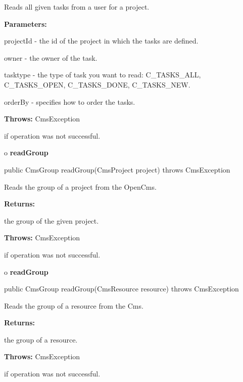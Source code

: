 \begin{description}
\htmlDD Reads all given tasks from a user for a project. 

\begin{description}
\item {\bf Parameters:}  

projectId - the id of the project in which the tasks are defined.  

owner - the owner of the task.  

tasktype - the type of task you want to read: C\_TASKS\_ALL, C\_TASKS\_OPEN,
C\_TASKS\_DONE, C\_TASKS\_NEW.  

orderBy - specifies how to order the tasks.  
\item {\bf Throws:} CmsException  

if operation was not successful.  
\end{description}

\end{description}

o {\bf readGroup} 

\begin{PRE}
 public CmsGroup readGroup(CmsProject project) throws CmsException
\end{PRE}

\begin{description}
\htmlDD Reads the group of a project from the OpenCms. 

\begin{description}
\item {\bf Returns:}  

the group of the given project.  
\item {\bf Throws:} CmsException  

if operation was not successful.  
\end{description}

\end{description}

o {\bf readGroup} 

\begin{PRE}
 public CmsGroup readGroup(CmsResource resource) throws CmsException
\end{PRE}

\begin{description}
\htmlDD Reads the group of a resource from the Cms. 

\begin{description}
\item {\bf Returns:}  

the group of a resource.  
\item {\bf Throws:} CmsException  

if operation was not successful.  
\end{description}

\end{description}

